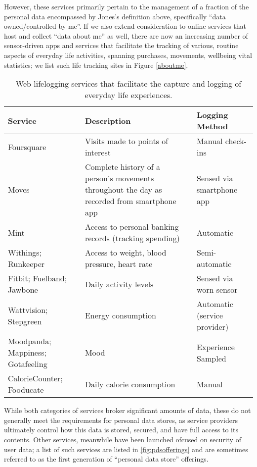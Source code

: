 \documentclass[runningheads,a4paper]{llncs}
\begin{document}
However, these services primarily pertain to the management of a fraction of the personal data encompassed by Jones's definition above, specifically ``data owned/controlled by me''.  If we also extend consideration to online services that host and collect ``data about me'' as well, there are now an increasing number of sensor-driven apps and services that facilitate the tracking of various, routine aspects of everyday life activities, spanning purchases, movements, wellbeing vital statistics; we list such life tracking sites in Figure \ref{aboutme}.

\begin{table}
\begin{tabular}{p{2cm} p{6.1cm} p{2.54cm}}
Service & Description & Logging Method \\
\hline
Foursquare & Visits made to points of interest & Manual check-ins \\
\hline
Moves & Complete history of a person's movements throughout the day as recorded from smartphone app  & Sensed via smartphone app \\ 
\hline
Mint & Access to personal banking records (tracking spending) & Automatic \\
\hline
Withings; Runkeeper & Access to weight, blood pressure, heart rate & Semi-automatic\\
\hline
Fitbit; Fuelband; Jawbone & Daily activity levels & Sensed via worn sensor \\ 
\hline
Wattvision; Stepgreen & Energy consumption & Automatic (service provider) \\
\hline
Moodpanda; Mappiness; Gotafeeling & Mood & Experience Sampled \\
\hline
CalorieCounter; Fooducate & Daily calorie consumption & Manual \\
\end{tabular}
\caption{Web lifelogging services that facilitate the capture and logging of everyday life experiences. }
\label{fig:aboutme}
\end{table}

While both categories of services broker significant amounts of data, these do not generally meet the requirements for personal data stores, as service providers ultimately control how this data is stored, secured, and have full access to its contents.  Other services, meanwhile have been launched ofcused on security of user data; a list of such services are listed in \ref{fig:pdsofferings} and are sometimes referred to as the first generation of ``personal data store'' offerings.
\end{document}
